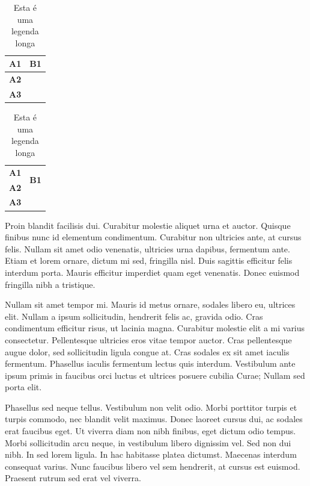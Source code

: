 \documentclass{article}
\begin{document}
	\renewcommand{\arraystretch}{1.5}
	\begin{table}[H]
		\centering
		\caption[Legenda curta]{Esta é uma legenda longa}
		\label{tab:tab2}
		\begin{tabular}{|l|l|l|}
			\hline
			\textbf{A1} & \multicolumn{2}{l|}{\textbf{B1}} \\ \hline
			\textbf{A2} &            &            \\ \hline
			\textbf{A3} &            &            \\ \hline
		\end{tabular}
	\end{table}
	
	\renewcommand{\arraystretch}{1.5}
	\begin{table}[H]
		\centering
		\caption[Legenda curta]{Esta é uma legenda longa}
		\label{tab:tab3}
		\begin{tabularx}{0.5\textwidth}{|X|X|X|}
			\hline
			\textbf{A1} & \multicolumn{2}{l|}{\multirow{2}{*}{\textbf{B1}}} \\ \cline{1-1}
			\textbf{A2} & \multicolumn{2}{l|}{}                             \\ \hline
			\textbf{A3} &                         &                         \\ \hline
		\end{tabularx}
	\end{table}
	
	Proin blandit facilisis dui. Curabitur molestie aliquet urna et auctor. Quisque finibus nunc id elementum condimentum. Curabitur non ultricies ante, at cursus felis. Nullam sit amet odio venenatis, ultricies urna dapibus, fermentum ante. Etiam et lorem ornare, dictum mi sed, fringilla nisl. Duis sagittis efficitur felis interdum porta. Mauris efficitur imperdiet quam eget venenatis. Donec euismod fringilla nibh a tristique.
	
	Nullam sit amet tempor mi. Mauris id metus ornare, sodales libero eu, ultrices elit. Nullam a ipsum sollicitudin, hendrerit felis ac, gravida odio. Cras condimentum efficitur risus, ut lacinia magna. Curabitur molestie elit a mi varius consectetur. Pellentesque ultricies eros vitae tempor auctor. Cras pellentesque augue dolor, sed sollicitudin ligula congue at. Cras sodales ex sit amet iaculis fermentum. Phasellus iaculis fermentum lectus quis interdum. Vestibulum ante ipsum primis in faucibus orci luctus et ultrices posuere cubilia Curae; Nullam sed porta elit.
	
	Phasellus sed neque tellus. Vestibulum non velit odio. Morbi porttitor turpis et turpis commodo, nec blandit velit maximus. Donec laoreet cursus dui, ac sodales erat faucibus eget. Ut viverra diam non nibh finibus, eget dictum odio tempus. Morbi sollicitudin arcu neque, in vestibulum libero dignissim vel. Sed non dui nibh. In sed lorem ligula. In hac habitasse platea dictumst. Maecenas interdum consequat varius. Nunc faucibus libero vel sem hendrerit, at cursus est euismod. Praesent rutrum sed erat vel viverra. 
	
\end{document}
